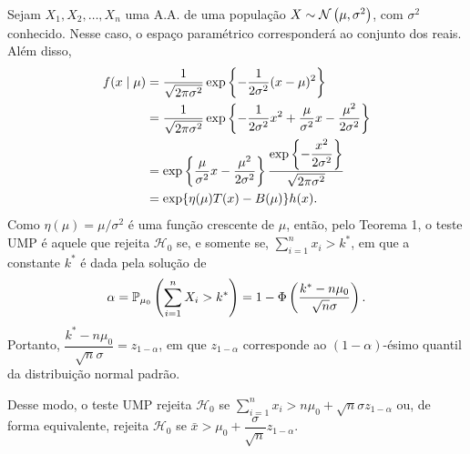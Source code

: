 \begin{theorem}
Sejam $X_1,X_2,\ldots,X_n$ uma A.A. de uma população $X\sim\normdist{\mu,\sigma^2}$, com $\sigma^2$ conhecido. Nesse caso, o espaço paramétrico corresponderá ao conjunto dos reais. Além disso,
\begin{align}
f(x\mid\mu) &= \frac{1}{\sqrt{2\pi\sigma^2}}\exp\left\{-\frac{1}{2\sigma^2}(x-\mu)^2\right\}\notag\\
&= \frac{1}{\sqrt{2\pi\sigma^2}}\exp\left\{-\frac{1}{2\sigma^2}x^2+\frac{\mu}{\sigma^2}x-\frac{\mu^2}{2\sigma^2}\right\}\notag\\
&= \exp\left\{\frac{\mu}{\sigma^2}x-\frac{\mu^2}{2\sigma^2}\right\}\frac{\exp\left\{-\dfrac{x^2}{2\sigma^2}\right\}}{\sqrt{2\pi\sigma^2}}\notag\\
&= \exp\{\eta(\mu)T(x)-B(\mu)\}h(x).
\end{align}
Como $\eta(\mu)=\mu/\sigma^2$ é uma função crescente de $\mu$, então, pelo Teorema 1, o teste UMP é aquele que rejeita $\mathcal{H}_0$ se, e somente se, $\sum_{i=1}^n x_i>k^*$, em que a constante $k^*$ é dada pela solução de
\begin{equation}
\alpha=\P_{\mu_0}\left(\sum_{i=1}^n X_i>k^*\right)=1-\Phi\left(\frac{k^*-n\mu_0}{\sqrt{n}\sigma}\right).
\end{equation}
Portanto, $\dfrac{k^*-n\mu_0}{\sqrt{n}\sigma}=z_{1-\alpha}$, em que $z_{1-\alpha}$ corresponde ao $(1-\alpha)$-ésimo quantil da distribuição normal padrão.

Desse modo, o teste UMP rejeita $\mathcal{H}_0$ se $\sum_{i=1}^n x_i>n\mu_0+\sqrt{n}\sigma z_{1-\alpha}$ ou, de forma equivalente, rejeita $\mathcal{H}_0$ se $\bar{x}>\mu_0+\dfrac{\sigma}{\sqrt{n}}z_{1-\alpha}$.
\end{theorem}


